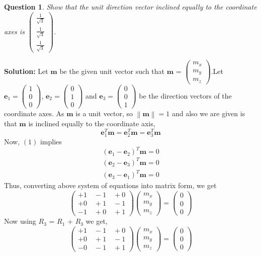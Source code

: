 \documentclass{article}
\newcommand{\solution}{\noindent \textbf{Solution: }}
\newtheorem{question}[theorem]{Question}
\newcommand{\myvec}[1]{\ensuremath{\begin{pmatrix}#1\end{pmatrix}}}
\newcommand{\norm}[1]{\left\lVert#1\right\rVert}
\let\vec\mathbf
\begin{document}
\begin{question}
	Show that the unit direction vector inclined equally to the coordinate axes is $\myvec{\frac{1}{\sqrt{3}} \\ \frac{1}{\sqrt{3}} \\ \frac{1}{\sqrt{3}}}$.
\end{question}
\solution Let $\vec{m}$ be the given unit vector such that $\vec{m}$ = $\myvec{m_x \\ m_y \\ m_z}$.Let $\vec{e}_1=\myvec{1 \\ 0 \\ 0}$, $\vec{e}_2=\myvec{0 \\ 1 \\ 0}$ and $\vec{e}_3=\myvec{0 \\ 0 \\ 1}$ be the direction vectors of the coordinate axes.
As $\vec{m}$ is a unit vector, so $\norm{\vec{m}} =1$ and also we are given is that $\vec{m}$ is inclined equally to the coordinate axis, 
\begin{equation}
\vec{e}_1^T\vec{m} =\vec{e}_2^T\vec{m}=\vec{e}_3^T\vec{m}
\end{equation}
Now, $(1)$ implies 
\begin{equation*}
(\vec{e}_1 -\vec{e}_2)^T\vec{m} = 0 
\end{equation*}
\begin{align*}
	(\vec{e}_2 -\vec{e}_3)^T\vec{m} = 0
\end{align*}	
\begin{align*}
	(\vec{e}_3 -\vec{e}_1)^T\vec{m} = 0
\end{align*}
Thus, converting above system of equations into matrix form, we get
\begin{equation}
\myvec{+1 \quad  -1 \quad +0 \\ +0 \quad +1 \quad -1 \\ -1 \quad +0 \quad +1 }\myvec{m_x \\ m_y \\ m_z} = \myvec{0 \\ 0 \\ 0}
\end{equation}
Now using $R_3$ = $R_1$ + $R_3$ we get,
\begin{equation}
\myvec{+1 \quad  -1 \quad +0 \\ +0 \quad +1 \quad -1 \\ -0 \quad -1 \quad +1 }\myvec{m_x \\ m_y \\ m_z} = \myvec{0 \\ 0 \\ 0}
\end{equation}
\end{document}
